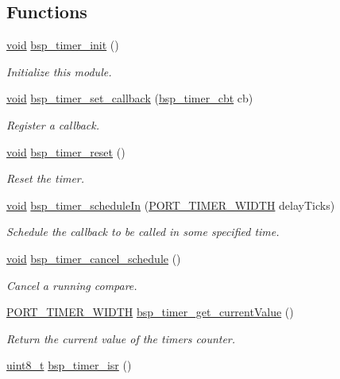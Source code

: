 \subsection*{Functions}
\begin{DoxyCompactItemize}
\item 
\hyperlink{usb__devapi_8h_afabf60e7f57651d6d595a02c75f07cd0}{void} \hyperlink{group__bsp__timer_gaffec2bf6372cf491a97821c19abad0fa}{bsp\+\_\+timer\+\_\+init} ()
\begin{DoxyCompactList}\small\item\em Initialize this module. \end{DoxyCompactList}\item 
\hyperlink{usb__devapi_8h_afabf60e7f57651d6d595a02c75f07cd0}{void} \hyperlink{group__bsp__timer_ga3a31a787657dccde5a1895fc87578589}{bsp\+\_\+timer\+\_\+set\+\_\+callback} (\hyperlink{openwsnmodule__obj_8h_a217f88f41d2d57897598ce4147c80419}{bsp\+\_\+timer\+\_\+cbt} cb)
\begin{DoxyCompactList}\small\item\em Register a callback. \end{DoxyCompactList}\item 
\hyperlink{usb__devapi_8h_afabf60e7f57651d6d595a02c75f07cd0}{void} \hyperlink{group__bsp__timer_ga797994251b8540f4be7628411cb98c73}{bsp\+\_\+timer\+\_\+reset} ()
\begin{DoxyCompactList}\small\item\em Reset the timer. \end{DoxyCompactList}\item 
\hyperlink{usb__devapi_8h_afabf60e7f57651d6d595a02c75f07cd0}{void} \hyperlink{group__bsp__timer_gac6b96b1c74c2fd8a4c307831d0fc7528}{bsp\+\_\+timer\+\_\+schedule\+In} (\hyperlink{z1_2board__info_8h_abe66b9c1c60db84f2a99f2b827275f24}{P\+O\+R\+T\+\_\+\+T\+I\+M\+E\+R\+\_\+\+W\+I\+D\+TH} delay\+Ticks)
\begin{DoxyCompactList}\small\item\em Schedule the callback to be called in some specified time. \end{DoxyCompactList}\item 
\hyperlink{usb__devapi_8h_afabf60e7f57651d6d595a02c75f07cd0}{void} \hyperlink{group__bsp__timer_ga46f9e9c7fb4f454fdc1febf216409ed6}{bsp\+\_\+timer\+\_\+cancel\+\_\+schedule} ()
\begin{DoxyCompactList}\small\item\em Cancel a running compare. \end{DoxyCompactList}\item 
\hyperlink{z1_2board__info_8h_abe66b9c1c60db84f2a99f2b827275f24}{P\+O\+R\+T\+\_\+\+T\+I\+M\+E\+R\+\_\+\+W\+I\+D\+TH} \hyperlink{group__bsp__timer_gae648940e8aa53efe781a7bbb056a9e50}{bsp\+\_\+timer\+\_\+get\+\_\+current\+Value} ()
\begin{DoxyCompactList}\small\item\em Return the current value of the timer\textquotesingle{}s counter. \end{DoxyCompactList}\item 
\hyperlink{_p_e___types_8h_aba7bc1797add20fe3efdf37ced1182c5}{uint8\+\_\+t} \hyperlink{group__bsp__timer_ga1e6f08f2808b6c73ae3ee4d31346abb9}{bsp\+\_\+timer\+\_\+isr} ()
\end{DoxyCompactItemize}
